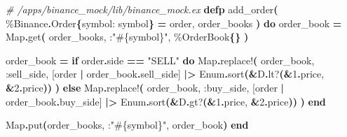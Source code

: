 \documentclass[
  oneside]{book}
\newenvironment{Shaded}{\begin{snugshade}}{\end{snugshade}}
\newcommand{\CommentTok}[1]{\textcolor[rgb]{0.56,0.35,0.01}{\textit{#1}}}
\newcommand{\ConstantTok}[1]{\textcolor[rgb]{0.56,0.35,0.01}{#1}}
\newcommand{\ControlFlowTok}[1]{\textcolor[rgb]{0.13,0.29,0.53}{\textbf{#1}}}
\newcommand{\DecValTok}[1]{\textcolor[rgb]{0.00,0.00,0.81}{#1}}
\newcommand{\FunctionTok}[1]{\textcolor[rgb]{0.13,0.29,0.53}{\textbf{#1}}}
\newcommand{\KeywordTok}[1]{\textcolor[rgb]{0.13,0.29,0.53}{\textbf{#1}}}
\newcommand{\NormalTok}[1]{#1}
\newcommand{\OperatorTok}[1]{\textcolor[rgb]{0.81,0.36,0.00}{\textbf{#1}}}
\newcommand{\OtherTok}[1]{\textcolor[rgb]{0.56,0.35,0.01}{#1}}
\newcommand{\StringTok}[1]{\textcolor[rgb]{0.31,0.60,0.02}{#1}}
\newcommand{\VariableTok}[1]{\textcolor[rgb]{0.00,0.00,0.00}{#1}}
\begin{document}
\begin{Shaded}
\begin{Highlighting}[]
\CommentTok{\# /apps/binance\_mock/lib/binance\_mock.ex}
  \KeywordTok{defp}\NormalTok{ add\_order}\FunctionTok{(}
\NormalTok{         \%}\ConstantTok{Binance}\OperatorTok{.}\ConstantTok{Order}\FunctionTok{\{}\VariableTok{symbol:}\NormalTok{ symbol}\FunctionTok{\}} \OperatorTok{=}\NormalTok{ order,}
\NormalTok{         order\_books}
       \FunctionTok{)} \KeywordTok{do}
\NormalTok{    order\_book }\OperatorTok{=}
      \ConstantTok{Map}\OperatorTok{.}\NormalTok{get}\FunctionTok{(}
\NormalTok{        order\_books,}
\NormalTok{        :}\StringTok{"}\OtherTok{\#\{}\NormalTok{symbol}\OtherTok{\}}\StringTok{"}\NormalTok{,}
\NormalTok{        \%}\ConstantTok{OrderBook}\FunctionTok{\{\}}
      \FunctionTok{)}

\NormalTok{    order\_book }\OperatorTok{=}
      \ControlFlowTok{if}\NormalTok{ order}\OperatorTok{.}\NormalTok{side }\OperatorTok{==} \StringTok{"SELL"} \KeywordTok{do}
        \ConstantTok{Map}\OperatorTok{.}\NormalTok{replace!}\FunctionTok{(}
\NormalTok{          order\_book,}
          \VariableTok{:sell\_side}\NormalTok{,}
          \OtherTok{[}\NormalTok{order }\OperatorTok{|}\NormalTok{ order\_book}\OperatorTok{.}\NormalTok{sell\_side}\OtherTok{]}
          \OperatorTok{|\textgreater{}} \ConstantTok{Enum}\OperatorTok{.}\NormalTok{sort}\FunctionTok{(}\OperatorTok{\&}\NormalTok{D}\OperatorTok{.}\NormalTok{lt?}\FunctionTok{(}\OperatorTok{\&}\DecValTok{1}\OperatorTok{.}\NormalTok{price, }\OperatorTok{\&}\DecValTok{2}\OperatorTok{.}\NormalTok{price}\FunctionTok{))}
        \FunctionTok{)}
      \ControlFlowTok{else}
        \ConstantTok{Map}\OperatorTok{.}\NormalTok{replace!}\FunctionTok{(}
\NormalTok{          order\_book,}
          \VariableTok{:buy\_side}\NormalTok{,}
          \OtherTok{[}\NormalTok{order }\OperatorTok{|}\NormalTok{ order\_book}\OperatorTok{.}\NormalTok{buy\_side}\OtherTok{]}
          \OperatorTok{|\textgreater{}} \ConstantTok{Enum}\OperatorTok{.}\NormalTok{sort}\FunctionTok{(}\OperatorTok{\&}\NormalTok{D}\OperatorTok{.}\NormalTok{gt?}\FunctionTok{(}\OperatorTok{\&}\DecValTok{1}\OperatorTok{.}\NormalTok{price, }\OperatorTok{\&}\DecValTok{2}\OperatorTok{.}\NormalTok{price}\FunctionTok{))}
        \FunctionTok{)}
      \KeywordTok{end}

    \ConstantTok{Map}\OperatorTok{.}\NormalTok{put}\FunctionTok{(}\NormalTok{order\_books, :}\StringTok{"}\OtherTok{\#\{}\NormalTok{symbol}\OtherTok{\}}\StringTok{"}\NormalTok{, order\_book}\FunctionTok{)}
  \KeywordTok{end}
\end{Highlighting}
\end{Shaded}
\end{document}
